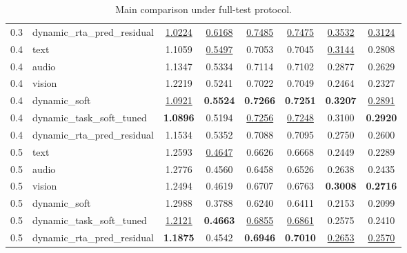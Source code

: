 \begin{table}[t]
\begin{tabular}{c l c c c c c c}
0.3 & dynamic_rta_pred_residual & \underline{1.0224} & \underline{0.6168} & \underline{0.7485} & \underline{0.7475} & \underline{0.3532} & \underline{0.3124} \\ 
0.4 & text & 1.1059 & \underline{0.5497} & 0.7053 & 0.7045 & \underline{0.3144} & 0.2808 \\ 
0.4 & audio & 1.1347 & 0.5334 & 0.7114 & 0.7102 & 0.2877 & 0.2629 \\ 
0.4 & vision & 1.2219 & 0.5241 & 0.7022 & 0.7049 & 0.2464 & 0.2327 \\ 
0.4 & dynamic_soft & \underline{1.0921} & \textbf{0.5524} & \textbf{0.7266} & \textbf{0.7251} & \textbf{0.3207} & \underline{0.2891} \\ 
0.4 & dynamic_task_soft_tuned & \textbf{1.0896} & 0.5194 & \underline{0.7256} & \underline{0.7248} & 0.3100 & \textbf{0.2920} \\ 
0.4 & dynamic_rta_pred_residual & 1.1534 & 0.5352 & 0.7088 & 0.7095 & 0.2750 & 0.2600 \\ 
0.5 & text & 1.2593 & \underline{0.4647} & 0.6626 & 0.6668 & 0.2449 & 0.2289 \\ 
0.5 & audio & 1.2776 & 0.4560 & 0.6458 & 0.6526 & 0.2638 & 0.2435 \\ 
0.5 & vision & 1.2494 & 0.4619 & 0.6707 & 0.6763 & \textbf{0.3008} & \textbf{0.2716} \\ 
0.5 & dynamic_soft & 1.2988 & 0.3788 & 0.6240 & 0.6411 & 0.2153 & 0.2099 \\ 
0.5 & dynamic_task_soft_tuned & \underline{1.2121} & \textbf{0.4663} & \underline{0.6855} & \underline{0.6861} & 0.2575 & 0.2410 \\ 
0.5 & dynamic_rta_pred_residual & \textbf{1.1875} & 0.4542 & \textbf{0.6946} & \textbf{0.7010} & \underline{0.2653} & \underline{0.2570} \\ 
\bottomrule
\end{tabular}
\caption{Main comparison under full-test protocol.}
\label{tab:residual_main}
\end{table}
